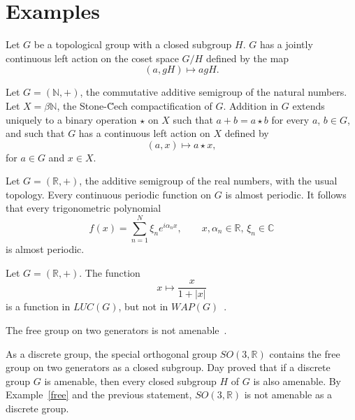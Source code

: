 \pagebreak
\section{Examples}

\begin{example}
Let $G$ be a topological group with a closed subgroup $H$.  $G$ has a jointly continuous left action
on the coset space $G/H$ defined by the map
\[
(a,gH)\mapsto agH.
\]
\end{example}

\begin{example}
Let $G = (\mathbb{N}, +)$, the commutative additive semigroup of the natural numbers.
Let $X = \beta\mathbb{N}$, the Stone-\u{C}ech compactification of $G$.
Addition in $G$ extends uniquely to a binary operation $\star$ on $X$ such that
$a+b = a\star b$ for every $a$, $b\in G$, and such that $G$ has a continuous 
left action on $X$ defined by
\[
(a, x) \mapsto a\star x,
\]
for $a\in G$ and $x\in X$.
\end{example}

\begin{example}
Let $G=(\mathbb{R}, +)$, the additive semigroup of the real numbers, with the usual topology.
Every continuous periodic function on $G$ is almost periodic.  It follows that every trigonometric
polynomial
\[
f(x) = \sum_{n=1}^N \xi_n e^{i\alpha_n x},\qquad x,\alpha_n\in\mathbb{R},\,\xi_n\in \mathbb{C}
\]
is almost periodic.
\end{example}

\begin{example}
Let $G=(\mathbb{R}, +)$.  The function
\[
x\mapsto \frac{x}{1 + |x|}
\]
is a function in $LUC(G)$, but not in $WAP(G)$~\cite[4.4.19]{milnes}.
\end{example}

\begin{example}\label{free}
The free group on two generators is not amenable~\cite[17.16]{h&r}.
\end{example}

\begin{example}[Day]
As a discrete group, the special orthogonal group $SO(3,\mathbb{R})$ contains
the free group on two generators as a closed subgroup.  Day proved that
if a discrete group $G$ is amenable, then every closed subgroup $H$ of $G$ is
also amenable.
By Example~\ref{free} and the previous statement, $SO(3,\mathbb{R})$
is not amenable as a discrete group.
\end{example}

